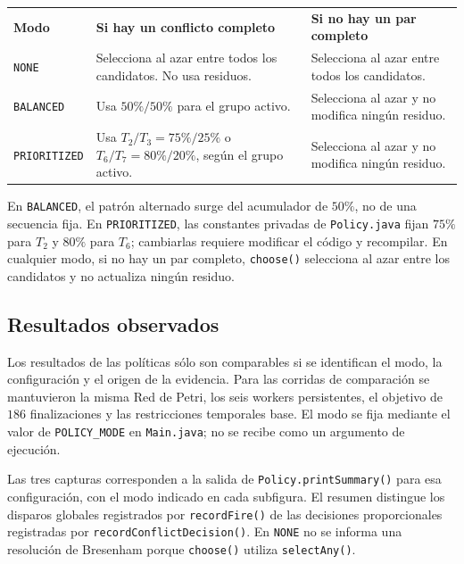 \documentclass[11pt,a4paper]{article}
\begin{document}
\begin{table}[H]
\centering
\begin{tabularx}{\textwidth}{l X X}
\toprule
\textbf{Modo} & \textbf{Si hay un conflicto completo} & \textbf{Si no hay un par completo} \\
\texttt{NONE} & Selecciona al azar entre todos los candidatos. No usa residuos. & Selecciona al azar entre todos los candidatos. \\
\texttt{BALANCED} & Usa $50\%/50\%$ para el grupo activo. & Selecciona al azar y no modifica ningún residuo. \\
\texttt{PRIORITIZED} & Usa $T_2/T_3=75\%/25\%$ o $T_6/T_7=80\%/20\%$, según el grupo activo. & Selecciona al azar y no modifica ningún residuo. \\
\bottomrule
\end{tabularx}
\end{table}

En \texttt{BALANCED}, el patrón alternado surge del acumulador de $50\%$, no de una secuencia fija. En \texttt{PRIORITIZED}, las constantes privadas de \texttt{Policy.java} fijan $75\%$ para $T_2$ y $80\%$ para $T_6$; cambiarlas requiere modificar el código y recompilar. En cualquier modo, si no hay un par completo, \texttt{choose()} selecciona al azar entre los candidatos y no actualiza ningún residuo.

\subsection{Resultados observados}

Los resultados de las políticas sólo son comparables si se identifican el modo, la configuración y el origen de la evidencia. Para las corridas de comparación se mantuvieron la misma Red de Petri, los seis workers persistentes, el objetivo de $186$ finalizaciones y las restricciones temporales base. El modo se fija mediante el valor de \texttt{POLICY\_MODE} en \texttt{Main.java}; no se recibe como un argumento de ejecución.

Las tres capturas corresponden a la salida de \texttt{Policy.printSummary()} para esa configuración, con el modo indicado en cada subfigura. El resumen distingue los disparos globales registrados por \texttt{recordFire()} de las decisiones proporcionales registradas por \texttt{recordConflictDecision()}. En \texttt{NONE} no se informa una resolución de Bresenham porque \texttt{choose()} utiliza \texttt{selectAny()}.
\end{document}
